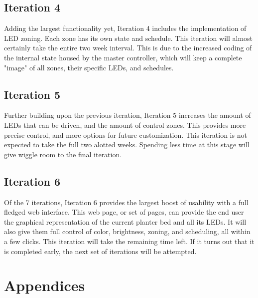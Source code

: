 \documentclass[onecolumn, draftclsnofoot,10pt, compsoc]{IEEEtran}
\begin{document}
		\subsection{Iteration 4}
		Adding the largest functionality yet, Iteration 4 includes the implementation of LED zoning.  Each zone has its own state and schedule.  This iteration
		will almost certainly take the entire two week interval. This is due to the increased coding of the internal state housed by the master controller, which
		will keep a complete "image" of all zones, their specific LEDs, and schedules.

		\subsection{Iteration 5}
		Further building upon the previous iteration, Iteration 5 increases the amount of LEDs that can be driven, and the amount of control zones. This provides
		more precise control, and more options for future customization. This iteration is not expected to take the full two alotted weeks.  Spending less time at
		this stage will give wiggle	room to the final iteration.

		\subsection{Iteration 6}
		Of the 7 iterations, Iteration 6 provides the largest boost of usability with a full fledged web interface.  This web page, or set of pages, can provide
		the end	user the graphical representation of the current planter bed and all its LEDs.  It will also give them full control of color, brightness, zoning,
		and scheduling, all within a few clicks.  This iteration will take the remaining time left.  If it turns out that it is completed early, the next set of
		iterations will be attempted.


	\section{Appendices} %
\end{document}

